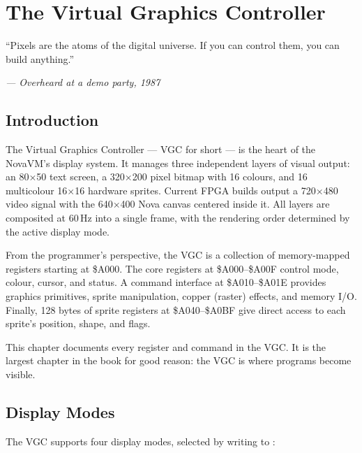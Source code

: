\chapter{The Virtual Graphics Controller}

\epigraph{``Pixels are the atoms of the digital universe.  If you can control
them, you can build anything.''}{\textit{--- Overheard at a demo party, 1987}}

\section*{Introduction}

The Virtual Graphics Controller --- VGC for short --- is the heart of the
NovaVM's display system.  It manages three independent layers of visual output:
an 80$\times$50 text screen, a 320$\times$200 pixel bitmap with 16 colours, and
16 multicolour 16$\times$16 hardware sprites.  Current FPGA builds output a
720$\times$480 video signal with the 640$\times$400 Nova canvas centered inside
it.  All layers are composited at 60\,Hz into a single frame, with the
rendering order determined by the active display mode.

From the programmer's perspective, the VGC is a collection of memory-mapped
registers starting at \$A000.  The core registers at \$A000--\$A00F control
mode, colour, cursor, and status.  A command interface at \$A010--\$A01E
provides graphics primitives, sprite manipulation, copper (raster) effects, and
memory I/O.  Finally, 128 bytes of sprite registers at \$A040--\$A0BF give
direct access to each sprite's position, shape, and flags.

This chapter documents every register and command in the VGC.  It is the
largest chapter in the book for good reason: the VGC is where programs become
visible.


\section{Display Modes}
\label{sec:vgc-modes}

The VGC supports four display modes, selected by writing to :

